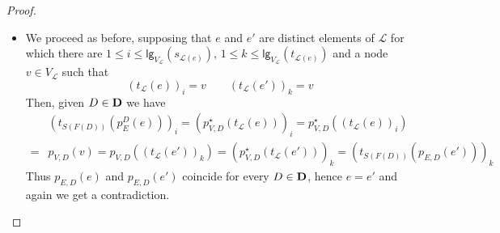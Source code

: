 \documentclass[3p]{elsarticle}
\newcommand{\lgh}{\mathsf{lg}}
\def\D{\textbf {\textup{D}}}
\theoremstyle{remark}
\theoremstyle{definition}
\begin{document}
\begin{proof}
\begin{itemize}
		\item  We proceed as before, supposing that $e$ and $e'$ are distinct elements of $\mathcal{L}$ for which there are $1\leq i \leq \lgh_{V_{\mathcal{L}}}(s_{\mathcal{L}(e)})$, $1\leq k \leq \lgh_{V_{\mathcal{L}}}(t_{\mathcal{L}(e)}) $ and a node $v\in V_{\mathcal{L}}$ such that
				\[(t_{\mathcal{L}}(e))_i=v \qquad  (t_{\mathcal{L}}(e') )_k= v\]
		Then, given $D\in \D$ we have
		\begin{align*}&(t_{S(F(D))}( p^D_{E}(e)))_i = ( p^\star_{V,D}(t_{\mathcal{L}}(e)))_i=p^\star_{V, D}((t_{\mathcal{L}}(e))_i)\\=&p_{V,D}(v)=p_{V, D}((t_{\mathcal{L}}(e'))_k)=(p^\star_{V,D}(t_{\mathcal{L}}(e')))_k=(t_{S(F(D))}( p_{E,D}(e')))_k  	
		\end{align*}
		Thus  $p_{E,D}(e)$ and $p_{E,D}(e')$ coincide for every $D\in \D$, hence  $e = e'$ and again we get a contradiction. \qedhere 
	\end{itemize}
\end{proof}


\pruned*
\end{document}
